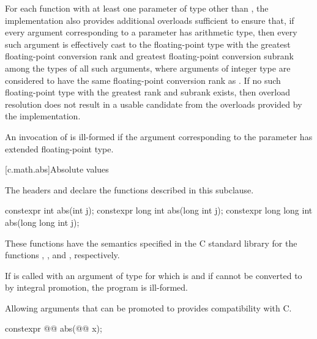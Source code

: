 \pnum
For each function
with at least one parameter of type 
other than ,
the implementation also provides additional overloads sufficient to ensure that,
if every argument corresponding to
a  parameter has arithmetic type,
then every such argument is effectively cast to the floating-point type
with the greatest floating-point conversion rank and
greatest floating-point conversion subrank
among the types of all such arguments,
where arguments of integer type are considered to have
the same floating-point conversion rank as .
If no such floating-point type with the greatest rank and subrank exists,
then overload resolution does not result in
a usable candidate
from the overloads provided by the implementation.

\pnum
An invocation of  is ill-formed if
the argument corresponding to the  parameter
has extended floating-point type.


[c.math.abs]{Absolute values}

\pnum
\begin{note}
The headers  and
declare the functions described in this subclause.
\end{note}

%
\begin{itemdecl}
constexpr int abs(int j);
constexpr long int abs(long int j);
constexpr long long int abs(long long int j);
\end{itemdecl}

\begin{itemdescr}
\pnum
\effects
These
functions have the semantics specified in the C standard library
for the functions , , and , respectively.

\pnum
\remarks
If  is called with an argument of type 
for which  is  and
if  cannot be converted to 
by integral promotion, the program is ill-formed.
\begin{note}
Allowing arguments that can be promoted to 
provides compatibility with C.
\end{note}
\end{itemdescr}

\begin{itemdecl}
constexpr @@ abs(@@ x);
\end{itemdecl}

